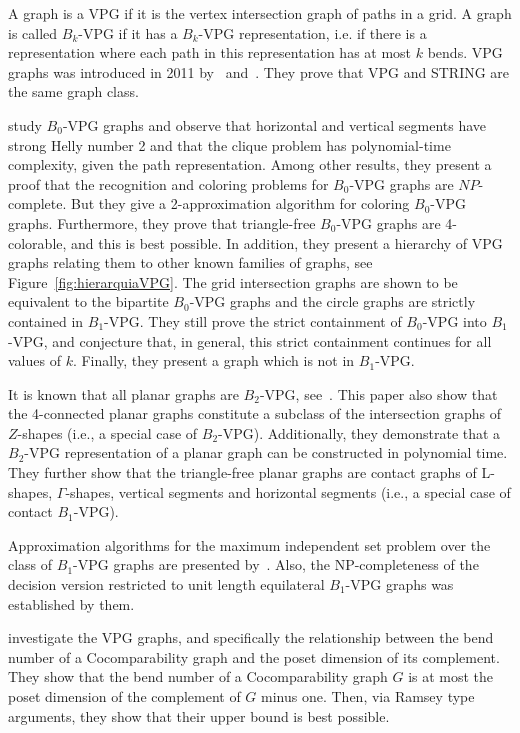 A graph is a VPG if it is the vertex intersection graph of paths in a grid. A graph is called
$B_k$-VPG if it has a $B_k$-VPG representation, i.e. if there is a representation where each path in this representation has at most $k$ bends. VPG graphs was introduced in 2011 by~\citet{asinowski2011string} and~\citet{asinowski2012}. They prove that VPG and STRING are
the same graph class.

\citet{asinowski2012} study $B_0$-VPG graphs and observe
that horizontal and vertical segments have strong Helly number 2 and that the clique problem has polynomial-time complexity, given the path representation. Among other results, they present a proof that the recognition and coloring problems for $B_0$-VPG graphs are $NP$-complete. But they  give a 2-approximation algorithm for coloring $B_0$-VPG graphs. Furthermore, they prove that triangle-free $B_0$-VPG graphs are 4-colorable, and this is best  possible. In addition, they present a hierarchy of VPG graphs relating them to other known families of graphs, see Figure~\ref{fig:hierarquiaVPG}. The grid intersection graphs are shown to be equivalent to the bipartite $B_0$-VPG graphs and the circle graphs are strictly contained in $B_1$-VPG. They still prove the strict containment of $B_0$-VPG into $B_1$-VPG, and conjecture that, in general, this strict containment continues for all values of $k$. Finally, they present
a graph which is not in $B_1$-VPG. 




It is known that all planar graphs are $B_2$-VPG, see~\cite{chaplick2012planar}. This paper also show that the 4-connected planar graphs constitute a subclass
of the intersection graphs of $Z$-shapes (i.e., a special case of $B_2$-VPG). Additionally, they demonstrate that a $B_2$-VPG representation of a planar
graph can be constructed in polynomial time. They further show that the triangle-free planar graphs are contact graphs of L-shapes, $\Gamma$-shapes, vertical segments and horizontal segments (i.e., a special case of contact $B_1$-VPG). 

Approximation algorithms for the maximum independent set problem over the class of $B_1$-VPG graphs are presented by~\citet{lahiri2015maximum}. Also, the NP-completeness of the decision version restricted to unit length equilateral   $B_1$-VPG graphs was established by them.

\citet{cohen2016posets} investigate the VPG graphs, and specifically the relationship between the bend number of a Cocomparability graph and the poset dimension of its complement. They show that the bend number of a Cocomparability graph $G$ is at most the poset dimension of the complement of $G$ minus one. Then, via Ramsey type arguments, they show that their upper bound is best  possible.


